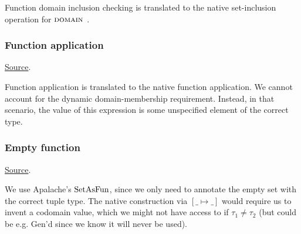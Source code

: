 \begin{mathpar}
\end{mathpar}
Function domain inclusion checking is translated to the \tlap{} native set-inclusion operation for $\DOMAIN$.

\subsubsection{ Function application}
\href{https://github.com/saltiniroberto/ssf/blob/7ea6e18093d9da3154b4e396dd435549f687e6b9/high_level/common/pythonic_code_generic.py#L104-L106}{Source}.



\begin{mathpar}
\end{mathpar}
Function application is translated to the \tlap{} native function application. We cannot account for the dynamic domain-membership requirement. Instead, in that scenario, the value of this expression is some unspecified element of the correct type.


\subsubsection{ Empty function}
\href{https://github.com/saltiniroberto/ssf/blob/7ea6e18093d9da3154b4e396dd435549f687e6b9/high_level/common/pythonic_code_generic.py#L109-L110}{Source}.



\begin{mathpar}
\end{mathpar}
We use Apalache's $\SetAsFun$, since we only need to annotate the empty set with the correct tuple type. The native construction via $[ \_ \mapsto \_]$ would require us to invent a codomain value, which we might not have access to if $\tau_1 \ne \tau_2$ (but could be e.g. $\mathrm{Gen}$'d since we know it will never be used).

